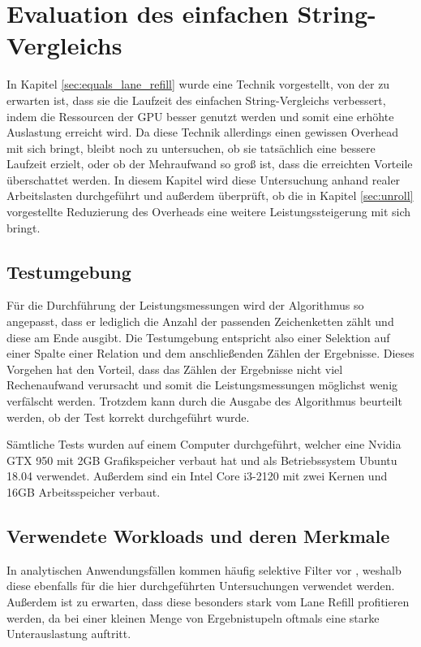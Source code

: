 \chapter{Evaluation des einfachen String-Vergleichs}
\label{sec:equals_evaluation}

In Kapitel \ref{sec:equals_lane_refill} wurde eine Technik vorgestellt, von der zu erwarten ist, dass sie die Laufzeit des einfachen String-Vergleichs verbessert, indem die Ressourcen der GPU besser genutzt werden und somit eine erhöhte Auslastung erreicht wird.
Da diese Technik allerdings einen gewissen Overhead mit sich bringt, bleibt noch zu untersuchen, ob sie tatsächlich eine bessere Laufzeit erzielt, oder ob der Mehraufwand so groß ist, dass die erreichten Vorteile überschattet werden.
In diesem Kapitel wird diese Untersuchung anhand realer Arbeitslasten durchgeführt und außerdem überprüft, ob die in Kapitel \ref{sec:unroll} vorgestellte Reduzierung des Overheads eine weitere Leistungssteigerung mit sich bringt.

\section{Testumgebung}
\label{sec:equals_testumgebung}

Für die Durchführung der Leistungsmessungen wird der Algorithmus so angepasst, dass er lediglich die Anzahl der passenden Zeichenketten zählt und diese am Ende ausgibt.
Die Testumgebung entspricht also einer Selektion auf einer Spalte einer Relation und dem anschließenden Zählen der Ergebnisse.
Dieses Vorgehen hat den Vorteil, dass das Zählen der Ergebnisse nicht viel Rechenaufwand verursacht und somit die Leistungsmessungen möglichst wenig verfälscht werden.
Trotzdem kann durch die Ausgabe des Algorithmus beurteilt werden, ob der Test korrekt durchgeführt wurde.

Sämtliche Tests wurden auf einem Computer durchgeführt, welcher eine Nvidia GTX 950 mit 2GB Grafikspeicher verbaut hat und als Betriebssystem Ubuntu 18.04 verwendet.
Außerdem sind ein Intel Core i3-2120 mit zwei Kernen und 16GB Arbeitsspeicher verbaut.

\section{Verwendete Workloads und deren Merkmale}
\label{sec:equals_evaluation_workloads}

In analytischen Anwendungsfällen kommen häufig selektive Filter vor \cite{Boncz2013}, weshalb diese ebenfalls für die hier durchgeführten Untersuchungen verwendet werden.
Außerdem ist zu erwarten, dass diese besonders stark vom Lane Refill profitieren werden, da bei einer kleinen Menge von Ergebnistupeln oftmals eine starke Unterauslastung auftritt.

